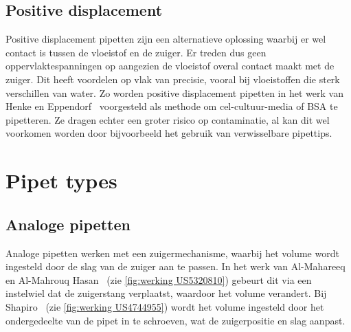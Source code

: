 \subsection{Positive displacement}
Positive displacement pipetten zijn een alternatieve oplossing waarbij er wel contact is tussen de vloeistof en de zuiger. Er treden dus geen oppervlaktespanningen op aangezien de vloeistof overal contact maakt met de zuiger. Dit heeft voordelen op vlak van precisie, vooral bij vloeistoffen die sterk verschillen van water. Zo worden positive displacement pipetten in het werk van Henke en Eppendorf\ \cite{RN37} voorgesteld als methode om cel-cultuur-media of BSA te pipetteren. Ze dragen echter een groter risico op contaminatie, al kan dit wel voorkomen worden door bijvoorbeeld het gebruik van verwisselbare pipettips.

\section{Pipet types}
\subsection{Analoge pipetten}\label{sec: Analoge pipetten}
Analoge pipetten werken met een zuigermechanisme, waarbij het volume wordt ingesteld door de slag van de zuiger aan te passen. In het werk van Al-Mahareeq en Al-Mahrouq Hasan\ \cite{RN17} (zie \autoref{fig:werking US5320810}) gebeurt dit via een instelwiel dat de zuigerstang verplaatst, waardoor het volume verandert. Bij Shapiro\ \cite{RN16} (zie \autoref{fig:werking US4744955}) wordt het volume ingesteld door het ondergedeelte van de pipet in te schroeven, wat de zuigerpositie en slag aanpast.

